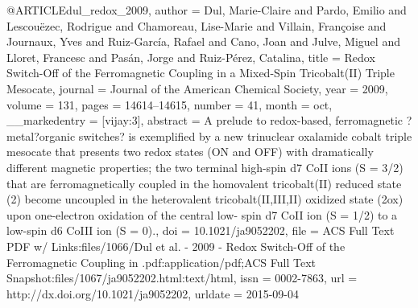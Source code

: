 @ARTICLE{dul_redox_2009,
  author = {Dul, Marie-Claire and Pardo, Emilio and Lescouëzec, Rodrigue and
	Chamoreau, Lise-Marie and Villain, Françoise and Journaux, Yves and
	Ruiz-García, Rafael and Cano, Joan and Julve, Miguel and Lloret,
	Francesc and Pasán, Jorge and Ruiz-Pérez, Catalina},
  title = {Redox {Switch}-{Off} of the {Ferromagnetic} {Coupling} in a {Mixed}-{Spin}
	{Tricobalt}({II}) {Triple} {Mesocate}},
  journal = {Journal of the American Chemical Society},
  year = {2009},
  volume = {131},
  pages = {14614--14615},
  number = {41},
  month = oct,
  __markedentry = {[vijay:3]},
  abstract = {A prelude to redox-based, ferromagnetic ?metal?organic switches? is
	exemplified by a new trinuclear oxalamide cobalt triple mesocate
	that presents two redox states (ON and OFF) with dramatically different
	magnetic properties; the two terminal high-spin d7 CoII ions (S =
	3/2) that are ferromagnetically coupled in the homovalent tricobalt(II)
	reduced state (2) become uncoupled in the heterovalent tricobalt(II,III,II)
	oxidized state (2ox) upon one-electron oxidation of the central low-
	spin d7 CoII ion (S = 1/2) to a low-spin d6 CoIII ion (S = 0).},
  doi = {10.1021/ja9052202},
  file = {ACS Full Text PDF w/ Links:files/1066/Dul et al. - 2009 - Redox Switch-Off of the             Ferromagnetic Coupling in .pdf:application/pdf;ACS Full Text Snapshot:files/1067/ja9052202.html:text/html},
  issn = {0002-7863},
  url = {http://dx.doi.org/10.1021/ja9052202},
  urldate = {2015-09-04}
}

